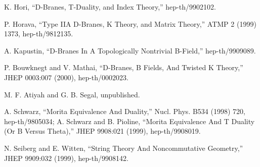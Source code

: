{\begin{enumerate}[label={[\arabic*]},leftmargin=2.4em,itemsep=2pt,topsep=4pt]
\item K. Hori, ``D-Branes, T-Duality, and Index Theory,'' hep-th/9902102.
\item P. Horava, ``Type IIA D-Branes, K Theory, and Matrix Theory,'' ATMP 2 (1999) 1373, hep-th/9812135.
\item A. Kapustin, ``D-Branes In A Topologically Nontrivial B-Field,'' hep-th/9909089.
\item P. Bouwknegt and V. Mathai, ``D-Branes, B Fields, And Twisted K Theory,'' JHEP 0003:007 (2000), hep-th/0002023.
\item M. F. Atiyah and G. B. Segal, unpublished.
\item A. Schwarz, ``Morita Equivalence And Duality,'' Nucl. Phys. B534 (1998) 720, hep-th/9805034; A. Schwarz and B. Pioline, ``Morita Equivalence And T Duality (Or B Versus Theta),'' JHEP 9908:021 (1999), hep-th/9908019.
\item N. Seiberg and E. Witten, ``String Theory And Noncommutative Geometry,'' JHEP 9909:032 (1999), hep-th/9908142.
\end{enumerate}
}
